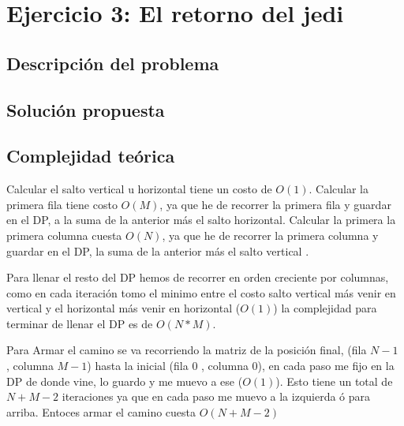 \section{Ejercicio 3: El retorno del jedi}

    \subsection{Descripción del problema}

    \subsection{Solución propuesta}

    \subsection{Complejidad teórica}

    Calcular el salto vertical u horizontal tiene un costo de $O(1)$. Calcular la primera fila tiene costo $O(M)$, ya que he de recorrer la primera fila y guardar en el DP, a la suma de la anterior más el salto horizontal. Calcular la primera la primera columna cuesta $O(N)$, ya que he de recorrer la primera columna y guardar en el DP,  la suma de la anterior más el salto vertical .

    Para llenar el resto del DP hemos de recorrer en orden creciente por columnas, como en cada iteración tomo el minimo entre el costo salto vertical más venir en vertical y el horizontal más venir en horizontal ($O(1)$) la complejidad para terminar de llenar el DP es de $O(N*M)$.

    Para Armar el camino se va recorriendo la matriz de la posición final, (fila $N - 1$ , columna $M - 1$) hasta la inicial (fila $0$ , columna $0$), en cada paso me fijo en la DP de donde vine, lo guardo y me muevo a ese ($O(1)$). Esto tiene un total de $N + M - 2$ iteraciones ya que en cada paso me muevo a la izquierda ó para arriba. Entoces armar el camino cuesta $O(N + M - 2)$

